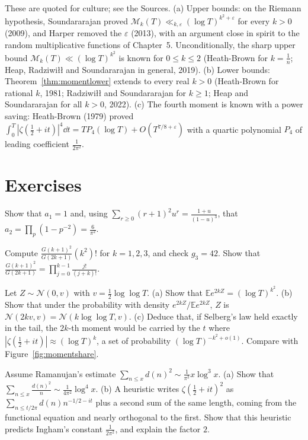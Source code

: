 \begin{remark}
These are quoted for culture; see the Sources. (a) Upper bounds: on the Riemann hypothesis, Soundararajan proved $\mathcal M_k(T)\ll_{k,\varepsilon}(\log T)^{k^2+\varepsilon}$ for every $k>0$ (2009), and Harper removed the $\varepsilon$ (2013), with an argument close in spirit to the random multiplicative functions of Chapter~5. Unconditionally, the sharp upper bound $\mathcal M_k(T)\ll(\log T)^{k^2}$ is known for $0\le k\le2$ (Heath-Brown for $k=\frac1n$; Heap, Radziwi\l\l{} and Soundararajan in general, 2019). (b) Lower bounds: Theorem~\ref{thm:momentlower} extends to every real $k>0$ (Heath-Brown for rational $k$, 1981; Radziwi\l\l{} and Soundararajan for $k\ge1$; Heap and Soundararajan for all $k>0$, 2022). (c) The fourth moment is known with a power saving: Heath-Brown (1979) proved $\int_0^T|\zeta(\frac12+it)|^4\dd t=TP_4(\log T)+O(T^{7/8+\varepsilon})$ with a quartic polynomial $P_4$ of leading coefficient $\frac1{2\pi^2}$.
\end{remark}

\section{Exercises}

\begin{exercise}[$\star$]\label{ex:ak}
Show that $a_1=1$ and, using $\sum_{r\ge0}(r+1)^2u^r=\frac{1+u}{(1-u)^3}$, that $a_2=\prod_p(1-p^{-2})=\frac6{\pi^2}$.
\end{exercise}

\begin{exercise}[$\star$]\label{ex:gk}
Compute $\frac{G(k+1)^2}{G(2k+1)}(k^2)!$ for $k=1,2,3$, and check $g_3=42$. Show that $\frac{G(k+1)^2}{G(2k+1)}=\prod_{j=0}^{k-1}\frac{j!}{(j+k)!}$.
\end{exercise}

\begin{exercise}[$\star\star$]\label{ex:lognormal}
Let $Z\sim\mathcal N(0,v)$ with $v=\frac12\log\log T$. (a) Show that $\mathbb Ee^{2kZ}=(\log T)^{k^2}$. (b) Show that under the probability with density $e^{2kZ}/\mathbb Ee^{2kZ}$, $Z$ is $\mathcal N(2kv,v)=\mathcal N(k\log\log T,v)$. (c) Deduce that, if Selberg's law held exactly in the tail, the $2k$-th moment would be carried by the $t$ where $|\zeta(\frac12+it)|\approx(\log T)^k$, a set of probability $(\log T)^{-k^2+o(1)}$. Compare with Figure~\ref{fig:momentshare}.
\end{exercise}

\begin{exercise}[$\star\star$]\label{ex:diagonal4}
Assume Ramanujan's estimate $\sum_{n\le x}d(n)^2\sim\frac1{\pi^2}x\log^3x$. (a) Show that $\sum_{n\le x}\frac{d(n)^2}n\sim\frac1{4\pi^2}\log^4x$. (b) A heuristic writes $\zeta(\frac12+it)^2$ as $\sum_{n\le t/2\pi}d(n)n^{-1/2-it}$ plus a second sum of the same length, coming from the functional equation and nearly orthogonal to the first. Show that this heuristic predicts Ingham's constant $\frac1{2\pi^2}$, and explain the factor $2$.
\end{exercise}

